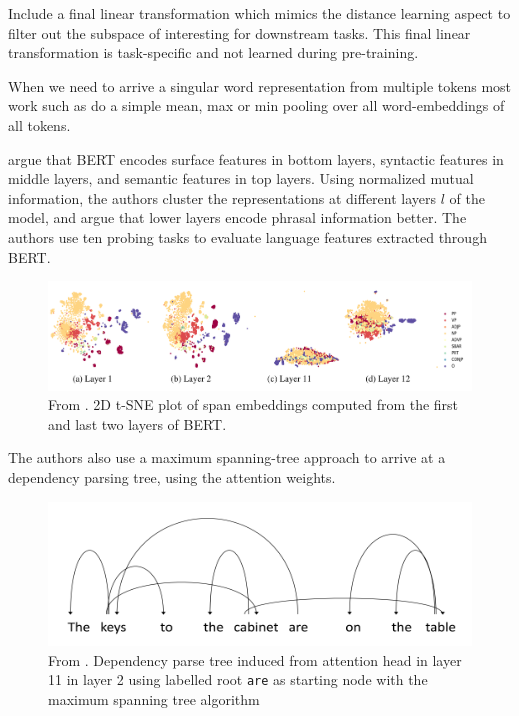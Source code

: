 \documentclass[a4paper,12pt,twoside,openright]{report}
\begin{document}
\cite{moradshahi19} Include a final linear transformation which mimics the distance learning aspect to filter out the subspace of interesting for downstream tasks.
This final linear transformation is task-specific and not learned during pre-training.

When we need to arrive a singular word representation from multiple tokens most work such as \cite{bommasani19, akbik19} do a simple mean, max or min pooling over all word-embeddings of all tokens.

\cite{jawahar19} argue that BERT encodes surface features in bottom layers, syntactic features in middle layers, and semantic features in top layers.
Using normalized mutual information, the authors cluster the representations at different layers $l$ of the model, and argue that lower layers encode phrasal information better.
The authors use ten probing tasks to evaluate language features extracted through BERT.

\begin{figure}[H]
	\center
  \includegraphics[width=0.9\linewidth]{./assets/relatedwork/BERT_tsne_layers.png}
  \caption{From \cite{jawahar19}. 2D t-SNE plot of span embeddings computed from the first and last two layers of BERT.}
  \label{fig:cold_fictional_desired}
\end{figure}

The authors also use a maximum spanning-tree approach to arrive at a dependency parsing tree, using the attention weights.

\begin{figure}[H]
	\center
  \includegraphics[width=0.7\linewidth]{./assets/relatedwork/BERT_dependency_parsing.png}
  \caption{From \cite{jawahar19}. Dependency parse tree induced from attention head in layer 11 in layer 2 using labelled root \texttt{are} as starting node with the maximum spanning tree algorithm}
  \label{fig:cold_fictional_desired}
\end{figure}
\end{document}
